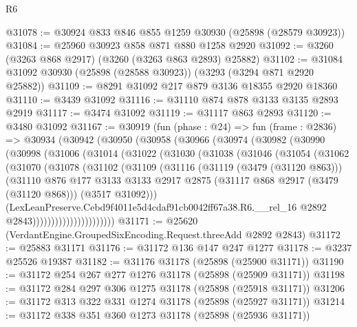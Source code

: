 \begin{lexlean}{R6}
\begin{coremodule}
@31078 := @30924 @833 @846 @855 @1259 @30930 (@25898 (@28579 @30923))
@31084 := @25960 @30923 @858 @871 @880 @1258 @2920
@31092 := @3260 (@3263 @868 @2917) (@3260 (@3263 @863 @2893) @25882)
@31102 := @31084 @31092 @30930 (@25898 (@28588 @30923)) (@3293 (@3294 @871 @2920 @25882))
@31109 := @8291 @31092 @217 @879 @3136 @18355 @2920 @18360
@31110 := @3439 @31092
@31116 := @31110 @874 @878 @3133 @3135 @2893 @2919
@31117 := @3474 @31092
@31119 := @31117 @863 @2893
@31120 := @3480 @31092
@31167 := @30919
    (fun (phase : @24) =>
    fun (frame : @2836) =>
    @30934
      (@30942
        (@30950
          (@30958
            (@30966
              (@30974
                (@30982
                  (@30990
                    (@30998
                      (@31006
                        (@31014
                          (@31022
                            (@31030
                              (@31038
                                (@31046
                                  (@31054
                                    (@31062
                                      (@31070
                                        (@31078
                                          (@31102
                                            (@31109
                                              (@31116
                                                (@31119 (@3479 (@31120 @863)))
                                                (@31110
                                                  @876
                                                  @177
                                                  @3133
                                                  @3133
                                                  @2917
                                                  @2875
                                                  (@31117 @868 @2917 (@3479 (@31120 @868)))
                                                  (@3517 @31092)))
                                              (LexLeanPreserve.Cebd9f4011e5d4cdaf91cb0042ff67a38.R6.__rel_16
                                                @2892
                                                @2843))))))))))))))))))))))
@31171 := @25620 (VerdantEngine.GroupedSixEncoding.Request.threeAdd @2892 @2843)
@31172 := @25883 @31171
@31176 := @31172 @136 @147 @247 @1277
@31178 := @3237 @25526 @19387
@31182 := @31176 @31178 (@25898 (@25900 @31171))
@31190 := @31172 @254 @267 @277 @1276 @31178 (@25898 (@25909 @31171))
@31198 := @31172 @284 @297 @306 @1275 @31178 (@25898 (@25918 @31171))
@31206 := @31172 @313 @322 @331 @1274 @31178 (@25898 (@25927 @31171))
@31214 := @31172 @338 @351 @360 @1273 @31178 (@25898 (@25936 @31171))

\end{coremodule}
\end{lexlean}
